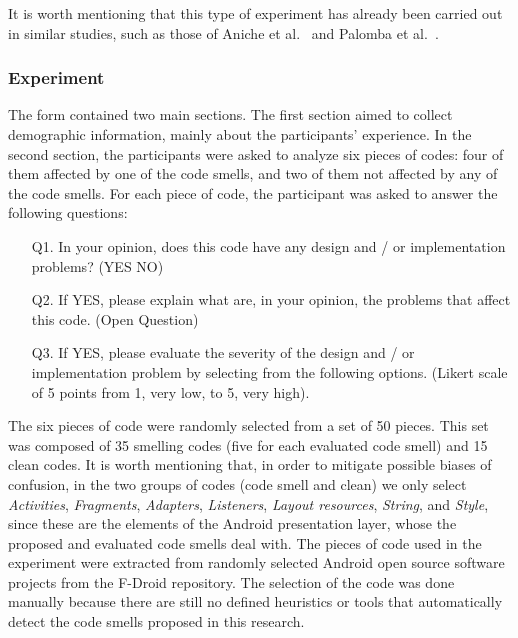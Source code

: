 It is worth mentioning that this type of experiment has already been carried out in similar studies, such as those of Aniche et al.~\cite{AnicheSmellsMVC:17, MvcSmells:16} and Palomba et al.~\cite{Palomba_Do_2014}.

\subsubsection{Experiment}
\label{etapa-3-experimento}

The form contained two main sections. The first section aimed to collect demographic information, mainly about the participants' experience. In the second section, the participants were asked to analyze six pieces of codes: four of them affected by one of the code smells, and two of them not affected by any of the code smells. For each piece of code, the participant was asked to answer the following questions:

\begin{itemize}

    \item[Q1.] 
    In your opinion, does this code have any design and / or implementation problems? (YES NO)

    \item[Q2.] If YES, please explain what are, in your opinion, the problems that affect this code. (Open Question)

    \item[Q3.] If YES, please evaluate the severity of the design and / or implementation problem by selecting from the following options. (Likert scale of 5 points from 1, very low, to 5, very high).

\end{itemize}


The six pieces of code were randomly selected from a set of 50 pieces. This set was composed of 35 smelling codes (five for each evaluated code smell) and 15 clean codes. It is worth mentioning that, in order to mitigate possible biases of confusion, in the two groups of codes (code smell and clean) we only select \textit{Activities}, \textit{Fragments}, \textit{Adapters}, \textit{Listeners}, \textit{Layout resources}, \textit{String}, and \textit{Style}, since these are the elements of the Android presentation layer, whose the proposed and evaluated code smells deal with. The pieces of code used in the experiment were extracted from randomly selected Android open source software projects from the F-Droid repository. 
The selection of the code was done manually because there are still no defined heuristics or tools that automatically detect the code smells proposed in this research.

